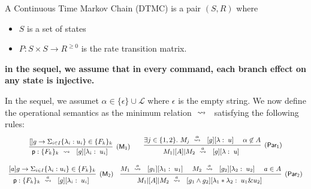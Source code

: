 \begin{definition}
  A Continuous Time Markov Chain (DTMC) is a pair $(S,R)$ where
  \begin{itemize}
  \item $S$ is a set of states
  \item $P: S\times S \rightarrow  R^{\geq 0}$ is the rate
    transition matrix.
  \end{itemize}
\end{definition}

\newpage

{\bf in the sequel, we assume that in every command, each branch
  effect on any state is injective.}


In the sequel, we assumet $\alpha\in\{\epsilon\}\cup \mathcal L$ where
$\epsilon$ is the empty string. We now define the operational
semantics as the minimum relation $\ \stackrel{}{\rightsquigarrow}\ {}$ satisfying the
following rules:
% 
\begin{displaymath}\small
  \begin{array}{ccc}
    \infer[\mathsf{(M_1)}]
    { {\role{p}:\{F_k\}_k} \prismred{}\lab{g}{\lambda_i}{u_i} }
    {\command {}g\lambda u\in\{F_k\}_k}
    \qquad
    \infer[\mathsf{(Par_1)}]
    {M_1\ppp A M_2\prismred{a}\lab g\lambda u }
    {
    \exists j\in\{1,2\}.\ 
    M_j\prismred{\alpha}\lab g\lambda u
    & \alpha\not\in A
    }
    \\\\
    \infer[\mathsf{(M_2)}]
    { {\role{p}:\{F_k\}_k} \prismred{a}\lab{g}{\lambda_i}{u_i} }
    {\command ag\lambda u\in\{F_k\}_k}
    \quad
    \infer[\mathsf{(Par_2)}]
    {M_1\ppp A M_2\prismred{a}\lab{g_1\land g_2}{\lambda_1*\lambda_2}{u_1\& u_2} }
    {
    M_1\prismred{a}\lab{g_1}{\lambda_1}{u_1} 
    & M_2\prismred{a}\lab{g_2}{\lambda_2}{u_2} 
                 & a\in A}
  \end{array}
\end{displaymath}


